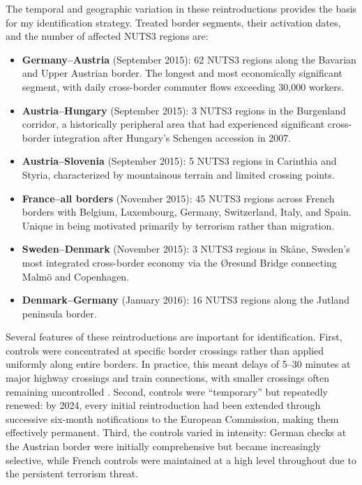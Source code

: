 \documentclass[12pt]{article}
\begin{document}
The temporal and geographic variation in these reintroductions provides the basis for my identification strategy. Treated border segments, their activation dates, and the number of affected NUTS3 regions are:

\begin{itemize}
    \item \textbf{Germany--Austria} (September 2015): 62 NUTS3 regions along the Bavarian and Upper Austrian border. The longest and most economically significant segment, with daily cross-border commuter flows exceeding 30,000 workers.
    \item \textbf{Austria--Hungary} (September 2015): 3 NUTS3 regions in the Burgenland corridor, a historically peripheral area that had experienced significant cross-border integration after Hungary's Schengen accession in 2007.
    \item \textbf{Austria--Slovenia} (September 2015): 5 NUTS3 regions in Carinthia and Styria, characterized by mountainous terrain and limited crossing points.
    \item \textbf{France--all borders} (November 2015): 45 NUTS3 regions across French borders with Belgium, Luxembourg, Germany, Switzerland, Italy, and Spain. Unique in being motivated primarily by terrorism rather than migration.
    \item \textbf{Sweden--Denmark} (November 2015): 3 NUTS3 regions in Sk\aa ne, Sweden's most integrated cross-border economy via the \O resund Bridge connecting Malm\"o and Copenhagen.
    \item \textbf{Denmark--Germany} (January 2016): 16 NUTS3 regions along the Jutland peninsula border.
\end{itemize}

Several features of these reintroductions are important for identification. First, controls were concentrated at specific border crossings rather than applied uniformly along entire borders. In practice, this meant delays of 5--30 minutes at major highway crossings and train connections, with smaller crossings often remaining uncontrolled \citep{EC2017Schengen}. Second, controls were ``temporary'' but repeatedly renewed: by 2024, every initial reintroduction had been extended through successive six-month notifications to the European Commission, making them effectively permanent. Third, the controls varied in intensity: German checks at the Austrian border were initially comprehensive but became increasingly selective, while French controls were maintained at a high level throughout due to the persistent terrorism threat.
\end{document}
